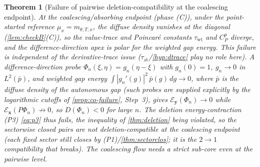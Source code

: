 \documentclass[reqno,final,11pt]{amsart}
\theoremstyle{plain}
\newtheorem{theorem}{Theorem}[section]
\theoremstyle{definition}
\theoremstyle{remark}
\newcommand{\cE}{\mathcal E}
\begin{document}
\begin{theorem}[Failure of pairwise deletion-compatibility at the coalescing endpoint]\label{thm:wall-endpoint}
At the coalescing/absorbing endpoint (phase \textnormal{(C)}), under the
point-started reference $\mu_x=m_{\theta,T,x}$, the diffuse
density vanishes at the diagonal (\cref{lem:checkB}(C)), so the value-trace and
Poincar\'e constants $\tau_{\mathrm{wt}}$ and $C^p_P$ diverge, and the
difference-direction apex is polar for the weighted gap energy. This
failure is independent of the derivative-trace issue
($\tau_{\mathrm{at}}$/\cref{hyp:dtrace} play no role here). A
difference-direction probe
$\Phi_n(\xi,\eta)=g_n(\eta-\xi)$ with $g_n(0)=1$, $g_n\to0$ in $L^2(\bar p)$, and
weighted gap energy $\int|g_n'(g)|^2\,\bar p(g)\,dg\to0$, where $\bar p$ is the
diffuse density of the autonomous gap (such probes are supplied explicitly by
the logarithmic cutoffs of \cref{prop:co-failure}, Step~3), gives
$\cE_{\mathbf y}(\Phi_n)\to0$ while
$\cE_{\mathbf x}(P\Phi_n)\not\to0$, so $D(\Phi_n)<0$ for large $n$.
The deletion energy-contraction \textnormal{(P3)} \eqref{eq:p3} thus
fails, the inequality of \cref{thm:deletion} being violated, so the
sectorwise closed pairs are not deletion-compatible at the coalescing
endpoint (each fixed sector still closes by (P1)/\cref{thm:sectorclos}; it is the
$2\to1$ compatibility that breaks). The coalescing flow needs a strict sub-core
even at the pairwise level.
\end{theorem}
\end{document}
